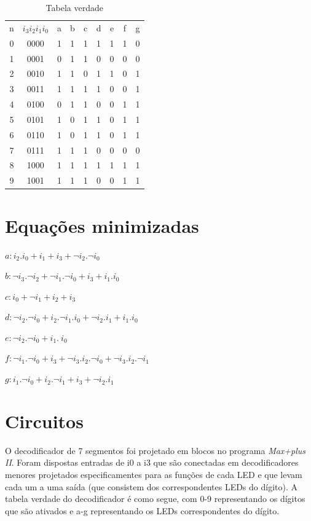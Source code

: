 \documentclass[a4paper]{article}
\begin{document}
\begin{table}[h]
\centering
\begin{tabular}{| *{9}{c |}}%
	\hline
	n\textordmasculine	&$i_3i_2i_1i_0$	&a &b &c &d &e &f &g \\
	0 &0000 &1 &1 &1 &1 &1 &1 &0 \\
	1 &0001 &0 &1 &1 &0 &0 &0 &0 \\
	2 &0010 &1 &1 &0 &1 &1 &0 &1 \\
	3 &0011 &1 &1 &1 &1 &0 &0 &1 \\
	4 &0100 &0 &1 &1 &0 &0 &1 &1 \\
	5 &0101 &1 &0 &1 &1 &0 &1 &1 \\
	6 &0110 &1 &0 &1 &1 &0 &1 &1 \\
	7 &0111 &1 &1 &1 &0 &0 &0 &0 \\
	8 &1000 &1 &1 &1 &1 &1 &1 &1 \\
	9 &1001 &1 &1 &1 &0 &0 &1 &1 \\ 
	\hline
\end{tabular}
\caption{Tabela verdade}
\end{table}

\section{Equações minimizadas}

$a: i_2.i_0 + i_1 + i_3 + \neg i_2.\neg i_0$

$b: \neg i_3.\neg i_2 + \neg i_1.\neg i_0 + i_3 + i_1.i_0$

$c: i_0 + \neg i_1 + i_2 + i_3$

$d: \neg i_2.\neg i_0 + i_2.\neg i_1.i_0 + \neg i_2.i_1 + i_1.i_0$

$e: \neg i_2.\neg i_0 + i_1.~i_0$

$f: \neg i_1.\neg i_0 + i_3 + \neg i_3.i_2.\neg i_0 + \neg i_3.i_2.\neg i_1$

$g: i_1.\neg i_0 + i_2.\neg i_1 + i_3 + \neg i_2.i_1$

\FloatBarrier

\section{Circuitos}

	O decodificador de 7 segmentos foi projetado em blocos no programa \emph{Max+plus II}. Foram dispostas entradas de i0 a i3 que são conectadas em decodificadores menores projetados especificamentes para as funções de cada LED e que levam cada um a uma saída (que consistem dos correspondentes LEDs do dígito).
	A tabela verdade do decodificador é como segue, com 0-9 representando os dígitos que são ativados e a-g representando os LEDs correspondentes do dígito.
\end{document}
